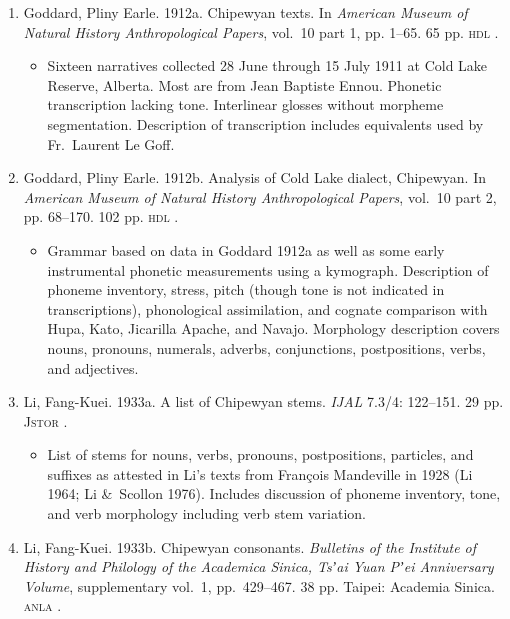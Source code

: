 \documentclass[12pt,letterpaper,oneside,article]{memoir}
\begin{document}
\begin{enumerate}
\item	Goddard, Pliny Earle.
	1912a.
	Chipewyan texts.
	In \textit{American Museum of Natural History Anthropological Papers}, vol.\ 10
	part 1, pp. 1–65.
	65 pp.
	\textsc{hdl} .
	\begin{itemize}
	\item	Sixteen narratives collected 28 June through 15 July 1911 at Cold Lake
		Reserve, Alberta.
		Most are from Jean Baptiste Ennou.
		Phonetic transcription lacking tone.
		Interlinear glosses without morpheme segmentation.
		Description of transcription includes equivalents used by Fr.\ 
		Laurent Le Goff.
	\end{itemize}
\item	Goddard, Pliny Earle.
	1912b.
	Analysis of Cold Lake dialect, Chipewyan.
	In \textit{American Museum of Natural History Anthropological Papers}, vol.\ 10
	part 2, pp. 68–170.
	102 pp.
	\textsc{hdl} .
	\begin{itemize}
	\item	Grammar based on data in Goddard 1912a as well as some early instrumental
		phonetic measurements using a kymograph.
		Description of phoneme inventory, stress, pitch (though tone is not indicated
		in transcriptions), phonological assimilation, and cognate comparison with
		Hupa, Kato, Jicarilla Apache, and Navajo.
		Morphology description covers nouns, pronouns, numerals, adverbs, conjunctions,
		postpositions, verbs, and adjectives.
	\end{itemize}
\item	Li, Fang-Kuei.
	1933a.
	A list of Chipewyan stems.
	\textit{IJAL} 7.3/4: 122–151.
	29 pp.
	\textsc{Jstor} .
	\begin{itemize}
	\item	List of stems for nouns, verbs, pronouns, postpositions, particles, and suffixes
		as attested in Li’s texts from François Mandeville in 1928
		(Li 1964; Li \&\ Scollon 1976).
		Includes discussion of phoneme inventory, tone, and verb morphology including
		verb stem variation.
	\end{itemize}
\item	Li, Fang-Kuei.
	1933b.
	Chipewyan consonants.
	\textit{Bulletins of the Institute of History and Philology of the Academica Sinica,
		Tsʼai Yuan Pʼei Anniversary Volume},
		supplementary vol.\ 1, pp.\ 429–467.
	38 pp.
	Taipei: Academia Sinica.
	\textsc{anla} .
	\begin{itemize}

\end{itemize}
\end{enumerate}
\end{document}
